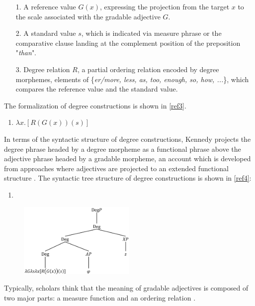 \documentclass{ctexart}
\let \cite \parencite
\begin{document}
\begin{itemize}
    \item[1.] A reference value $G(x)$, expressing the projection from the target $x$ to the scale associated with the gradable adjective $G$.
    \item[2.] A standard value $s$, which is indicated via measure phrase or the comparative clause landing at the complement position of the preposition "\textit{than}". 
    \item[3.] Degree relation $R$, a partial ordering relation encoded by degree morphemes, elements of \{\textit{er/more, less, as, too, enough, so, how, ...}\}, which compares the reference value and the standard value. 
\end{itemize}

The formalization of degree constructions is shown in \ref{ref3}.

\begin{enumerate}[resume]
\item \label{ref3} $\lambda x.[R(G(x))(s)]$
\end{enumerate}

In terms of the syntactic structure of degree constructions, Kennedy projects the degree phrase headed by a degree morpheme as a functional phrase above the adjective phrase headed by a gradable morpheme, an account which is developed from approaches where adjectives are projected to an extended functional structure \cite{abney1987,corver1990,corver1997b,grimshaw1991}. The syntactic tree structure of degree constructions is shown in \ref{ref4}:

\begin{enumerate}[resume]
\item \label{ref4}
\end{enumerate}

\begin{figure}[h]
\centering
\includegraphics[width=0.5\textwidth]{pic/pic1.png}
\end{figure}

Typically, scholars think that the meaning of gradable adjectives is composed of two major parts: a measure function and an ordering relation \cite{carston2013,horn1992}.
\end{document}
